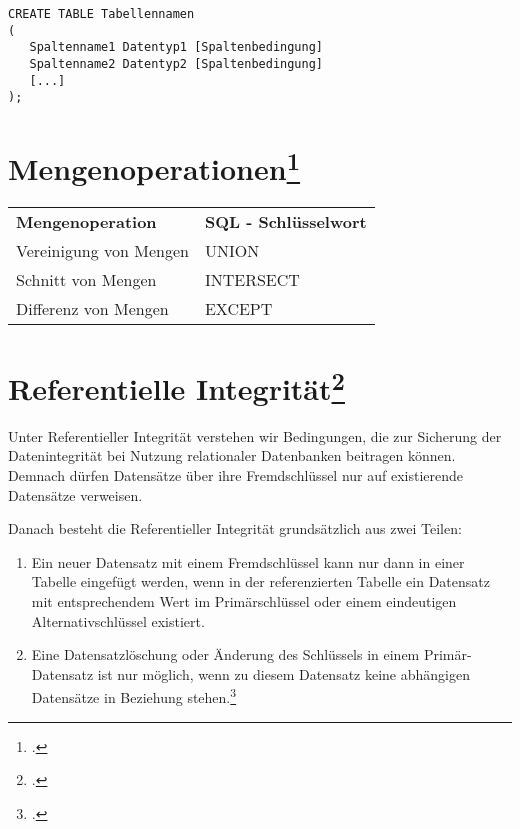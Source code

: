\documentclass{bschlangaul-haupt}
\begin{document}
\begin{verbatim}
CREATE TABLE Tabellennamen
(
   Spaltenname1 Datentyp1 [Spaltenbedingung]
   Spaltenname2 Datentyp2 [Spaltenbedingung]
   [...]
);
\end{verbatim}

%

\section{Mengenoperationen\footcite[Seite 157]{winter}}

\noindent
\begin{tabular}{ll}
\textbf{Mengenoperation} &
\textbf{SQL - Schlüsselwort} \\

Vereinigung von Mengen &
UNION \\

Schnitt von Mengen &
INTERSECT \\

Differenz von Mengen &
EXCEPT \\
\end{tabular}

%

\section{Referentielle Integrität\footcite[Seite 14]{db:fs:3}}

Unter Referentieller Integrität verstehen wir Bedingungen, die zur
Sicherung der Datenintegrität bei Nutzung relationaler Datenbanken
beitragen können. Demnach dürfen Datensätze über ihre
Fremdschlüssel nur auf existierende Datensätze verweisen.

Danach besteht die Referentieller Integrität grundsätzlich aus zwei
Teilen:

\begin{enumerate}

\item Ein neuer Datensatz mit einem Fremdschlüssel kann nur dann in
einer Tabelle eingefügt werden, wenn in der referenzierten Tabelle ein
Datensatz mit entsprechendem Wert im Primärschlüssel oder einem
eindeutigen Alternativschlüssel existiert.

\item Eine Datensatzlöschung oder Änderung des Schlüssels in einem
Primär-Datensatz ist nur möglich, wenn zu diesem Datensatz keine
abhängigen Datensätze in Beziehung stehen.\footcite{wiki:referentielle-Integritaet}
\end{enumerate}
\end{document}
